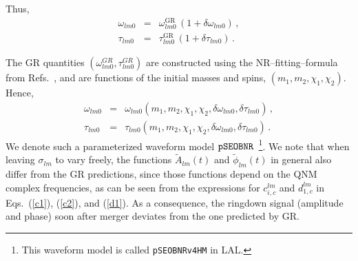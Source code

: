 Thus,
\begin{subequations}
\begin{eqnarray}
\omega_{l m 0} &=& \omega_{l m 0}^{\text{GR}}\, (1 + \delta \omega_{l m 0})\,,\label{eq:nongr_freqs_a} \\
\tau _{l m 0} &=& \tau _{l m 0}^{\text{GR}}\, (1 + \delta \tau_{l m 0})\,. \label{eq:nongr_freqs_b}
\end{eqnarray}
\end{subequations}

The GR quantities $( \omega_{l m 0}^{GR},\tau_{l m 0}^{GR})$ are
constructed using the NR--fitting--formula from Refs.~\cite{Taracchini:2013rva,Hofmann:2016yih}, and are functions of the initial masses and spins, $(m_1, m_2, \chi_1, \chi_2)$. Hence,
\begin{subequations}
\begin{eqnarray}
\omega_{l m 0} &=& \omega_{l m 0}(m_1, m_2, \chi_1, \chi_2, \delta \omega_{l m 0}, \delta \tau_{l m 0})\,,\\
\tau _{l m 0} &=& \tau _{l m 0}(m_1, m_2, \chi_1, \chi_2, \delta \omega_{l m 0}, \delta \tau_{l m 0})\,.
\end{eqnarray}
\end{subequations}
We denote such a parameterized waveform model $\texttt{pSEOBNR}$~\footnote{This
waveform model is called {\tt pSEOBNRv4HM} in LAL.}. We note that when leaving $\sigma_{l m}$ to vary
freely, the functions $\tilde{A}_{l m}(t)$ and $\tilde{\phi}_{l
  m}(t)$ in general also differ from the GR predictions, since
those functions depend on the QNM complex frequencies, as can be seen
from the expressions for $c_{i,c}^{l m}$ and $d_{1,c}^{l m}$ in Eqs.~(\ref{c1}),
(\ref{c2}), and (\ref{d1}). As a consequence, the ringdown signal (amplitude and phase)
soon after merger deviates from the one predicted by GR.
\fi
